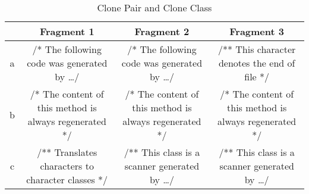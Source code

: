 


\begin{table}
	\caption{Clone Pair and Clone Class}
	\label{table:cloneClass}
	\begin{tabularx}{1.0\textwidth}{|c|C|C|C|}
		\hline
		&Fragment 1 & Fragment 2 & Fragment 3 \\
		\hline
		a &
		/* The following code was generated by \dots */ &
		/* The following code was generated by \dots */ &
		/** This character denotes the end of file */ \\
		\hline
		b &
		/* The content of this method is always regenerated */ &
		/* The content of this method is always regenerated */ &
		/* The content of this method is always regenerated */ \\
		\hline
		c &
		/** Translates characters to character classes
		*/ &
		 /** This class is a scanner generated by \dots */ &
		 /** This class is a scanner generated by \dots */ \\
		\hline
	\end{tabularx}
\end{table}